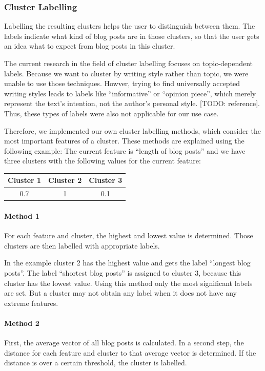 
\subsubsection{Cluster Labelling}
\label{sec:cluster_labeling}
Labelling the resulting clusters helps the user to distinguish between them.
The labels indicate what kind of blog posts are in those clusters, so that the user gets an idea what to expect from blog posts in this cluster.

The current research in the field of cluster labelling focuses on topic-dependent labels.
Because we want to cluster by writing style rather than topic, we were unable to use those techniques.
Howver, trying to find universally accepted writing styles leads to labels like ``informative'' or ``opinion piece'', which merely represent the text's intention, not the author's personal style. [TODO: reference].
Thus, these types of labels were also not applicable for our use case.

Therefore, we implemented our own cluster labelling methods, which consider the most important features of a cluster.
These methods are explained using the following example:
The current feature is ``length of blog posts'' and we have three clusters with the following values for the current feature:
\begin{center}
\begin{tabular}{c|c|c}
  Cluster 1 & Cluster 2 & Cluster 3 \\ \hline
  0.7 & 1 & 0.1 \\
 \end{tabular}
\end{center}
\paragraph{Method 1}
For each feature and cluster, the highest and lowest value is determined.
Those clusters are then labelled with appropriate labels.

In the example cluster 2 has the highest value and gets the label ``longest blog posts''.
The label ``shortest blog posts'' is assigned to cluster 3, because this cluster has the lowest value.
Using this method only the most significant labels are set.
But a cluster may not obtain any label when it does not have any extreme features.

\paragraph{Method 2}
First, the average vector of all blog posts is calculated.
In a second step, the distance for each feature and cluster to that average vector is determined.
If the distance is over a certain threshold, the cluster is labelled.


